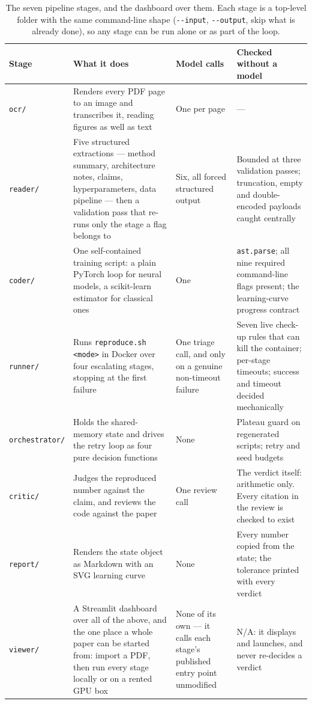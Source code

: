 \documentclass[10pt,twocolumn]{article}
\newcommand{\squeeze}{\setlength{\tabcolsep}{4pt}}
\begin{document}
\begin{table}[tbp]
\centering
\small
\caption{The seven pipeline stages, and the dashboard over them. Each stage is a top-level folder
with the same command-line shape (\texttt{-{}-input}, \texttt{-{}-output}, skip what is already
done), so any stage can be run alone or as part of the loop.}
\label{tab:stages}
\squeeze
\begin{tabular}{L{0.16\textwidth}L{0.28\textwidth}L{0.21\textwidth}L{0.25\textwidth}}
\toprule
Stage & What it does & Model calls & Checked without a model \\
\midrule
\texttt{ocr/} & Renders every PDF page to an image and transcribes it, reading figures as well
  as text & One per page & --- \\
\texttt{reader/} & Five structured extractions --- method summary, architecture notes, claims,
  hyperparameters, data pipeline --- then a validation pass that re-runs only the stage a flag
  belongs to & Six, all forced structured output & Bounded at three validation passes;
  truncation, empty and double-encoded payloads caught centrally \\
\texttt{coder/} & One self-contained training script: a plain PyTorch loop for neural models, a
  scikit-learn estimator for classical ones & One & \texttt{ast.parse}; all nine required
  command-line flags present; the learning-curve progress contract \\
\texttt{runner/} & Runs \texttt{reproduce.sh <mode>} in Docker over four escalating stages,
  stopping at the first failure & One triage call, and only on a genuine non-timeout failure &
  Seven live check-up rules that can kill the container; per-stage timeouts; success and timeout
  decided mechanically \\
\texttt{orchestrator/} & Holds the shared-memory state and drives the retry loop as four pure
  decision functions & None & Plateau guard on regenerated scripts; retry and seed budgets \\
\texttt{critic/} & Judges the reproduced number against the claim, and reviews the code against
  the paper & One review call & The verdict itself: arithmetic only. Every citation in the review
  is checked to exist \\
\texttt{report/} & Renders the state object as Markdown with an SVG learning curve & None & Every
  number copied from the state; the tolerance printed with every verdict \\
\midrule
\texttt{viewer/} & A Streamlit dashboard over all of the above, and the one place a whole paper
  can be started from: import a PDF, then run every stage locally or on a rented GPU box &
  None of its own --- it calls each stage's published entry point unmodified & N/A: it displays
  and launches, and never re-decides a verdict \\
\bottomrule
\end{tabular}
\end{table}
\end{document}
